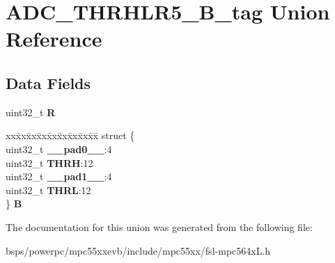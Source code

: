\hypertarget{unionADC__THRHLR5__32B__tag}{}\section{A\+D\+C\+\_\+\+T\+H\+R\+H\+L\+R5\+\_\+B\+\_\+tag Union Reference}
\label{unionADC__THRHLR5__32B__tag}
\subsection*{Data Fields}
\begin{DoxyCompactItemize}
\item 
\mbox{\label{unionADC__THRHLR5__32B__tag_a5ae9a8f13a5c1cf211ce747a782d904c}} 
uint32\+\_\+t {\bfseries R}
\item 
\mbox{\label{unionADC__THRHLR5__32B__tag_a1c4c9902c0ff286334fd7a976810df1e}} 
\begin{tabbing}
xx\=xx\=xx\=xx\=xx\=xx\=xx\=xx\=xx\=\kill
struct \{\\
\>uint32\_t {\bfseries \_\_pad0\_\_}:4\\
\>uint32\_t {\bfseries THRH}:12\\
\>uint32\_t {\bfseries \_\_pad1\_\_}:4\\
\>uint32\_t {\bfseries THRL}:12\\
\} {\bfseries B}\\

\end{tabbing}\end{DoxyCompactItemize}


The documentation for this union was generated from the following file\+:\begin{DoxyCompactItemize}
\item 
bsps/powerpc/mpc55xxevb/include/mpc55xx/fsl-\/mpc564x\+L.\+h\end{DoxyCompactItemize}
